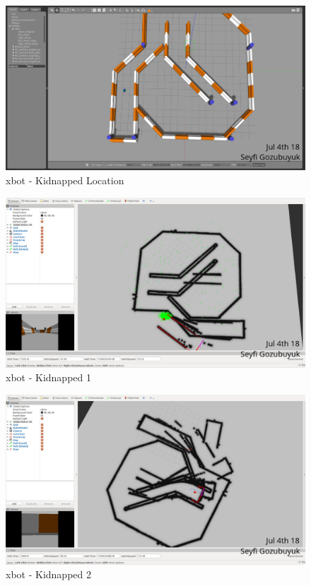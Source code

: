 \documentclass[10pt,journal,compsoc]{IEEEtran}
\begin{document}
\begin{figure}[thpb]
      \centering
      \includegraphics[width=\linewidth]{figures/xbotKidnapLocation.png}
      \caption{xbot - Kidnapped Location}
      \label{fig:xbotloc}
\end{figure}

\begin{figure}[thpb]
      \centering
      \includegraphics[width=\linewidth]{figures/xbotKidnap1.png}
      \caption{xbot - Kidnapped 1}
      \label{fig:xbotkid1}
\end{figure}

\begin{figure}[thpb]
      \centering
      \includegraphics[width=\linewidth]{figures/xbotKidnap2.png}
      \caption{xbot - Kidnapped 2}
      \label{fig:xbotkid2}
\end{figure}
\end{document}
